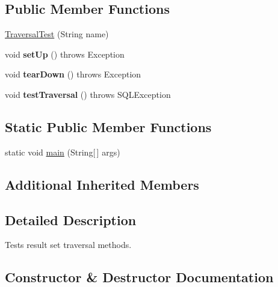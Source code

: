 \subsection*{Public Member Functions}
\begin{DoxyCompactItemize}
\item 
\mbox{\hyperlink{classtestsuite_1_1simple_1_1_traversal_test_aab43c85339e7f465ad57bb3db55b6649}{Traversal\+Test}} (String name)
\item 
\mbox{\label{classtestsuite_1_1simple_1_1_traversal_test_a4715980c14675baf75ed7cbbacc2f7b5}} 
void {\bfseries set\+Up} ()  throws Exception 
\item 
\mbox{\label{classtestsuite_1_1simple_1_1_traversal_test_a8f7344c09351c45f90dd4b8b9be3be40}} 
void {\bfseries tear\+Down} ()  throws Exception 
\item 
\mbox{\label{classtestsuite_1_1simple_1_1_traversal_test_a7a7160b9550ff25b80370eed85097efb}} 
void {\bfseries test\+Traversal} ()  throws S\+Q\+L\+Exception 
\end{DoxyCompactItemize}
\subsection*{Static Public Member Functions}
\begin{DoxyCompactItemize}
\item 
static void \mbox{\hyperlink{classtestsuite_1_1simple_1_1_traversal_test_a26e0a3c13820f4daedefe73785a7fde8}{main}} (String\mbox{[}$\,$\mbox{]} args)
\end{DoxyCompactItemize}
\subsection*{Additional Inherited Members}


\subsection{Detailed Description}
Tests result set traversal methods. 

\subsection{Constructor \& Destructor Documentation}
\mbox{\label{classtestsuite_1_1simple_1_1_traversal_test_aab43c85339e7f465ad57bb3db55b6649}} 
